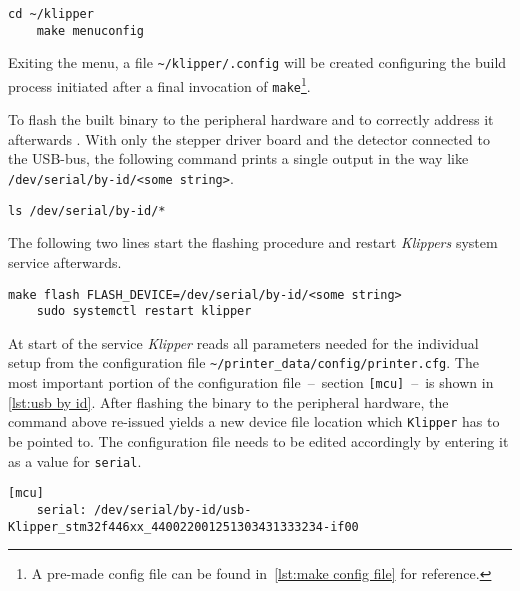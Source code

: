         \begin{lstlisting}[style=mybash, numbers=none]
    cd ~/klipper
    make menuconfig
        \end{lstlisting}

        Exiting the menu, a file \texttt{\textasciitilde/klipper/.config} will be created configuring the build process initiated after a final invocation of \texttt{make}\footnote{A pre-made config file can be found in~\cref{lst:make config file} for reference.}.\par\medskip

        To flash the built binary to the peripheral hardware and to correctly address it afterwards . With only the stepper driver board and the detector connected to the USB-bus, the following command prints a single output in the way like \texttt{/dev/serial/by-id/<some string>}.

        \begin{lstlisting}[style=mybash, numbers=none]
    ls /dev/serial/by-id/*
        \end{lstlisting}
        
        The following two lines start the flashing procedure and restart \textit{Klippers} system service afterwards.
        
        \begin{lstlisting}[style=mybash, numbers=none]
    make flash FLASH_DEVICE=/dev/serial/by-id/<some string>
    sudo systemctl restart klipper
        \end{lstlisting}

        At start of the service \textit{Klipper} reads all parameters needed for the individual setup from the configuration file \texttt{\textasciitilde/printer\_data/config/printer.cfg}.
        The most important portion of the configuration file~--~section \texttt{[mcu]}~--~is shown in \cref{lst:usb by id}.
        After flashing the binary to the peripheral hardware, the command above re-issued yields a new device file location which \texttt{Klipper} has to be pointed to.
        The configuration file needs to be edited accordingly by entering it as a value for \texttt{serial}.
        \begin{lstlisting}[style=mydjango, firstnumber=7,
            caption={[\texttt{mcu}-section of \texttt{printer.cfg} showing the id of the connected serial device]\texttt{mcu}-section of the \texttt{printer.cfg} showing the id of the connected serial device.},
            label={lst:usb by id}%
            ]
    [mcu]
    serial: /dev/serial/by-id/usb-Klipper_stm32f446xx_440022001251303431333234-if00
        \end{lstlisting}

